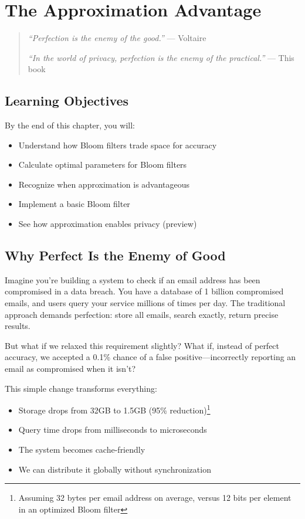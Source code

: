 \chapter{The Approximation Advantage}
\label{ch:approximation}

\begin{quote}
\emph{``Perfection is the enemy of the good.''} — Voltaire

\emph{``In the world of privacy, perfection is the enemy of the practical.''} — This book
\end{quote}

\section*{Learning Objectives}
By the end of this chapter, you will:
\begin{itemize}
\item Understand how Bloom filters trade space for accuracy
\item Calculate optimal parameters for Bloom filters
\item Recognize when approximation is advantageous
\item Implement a basic Bloom filter
\item See how approximation enables privacy (preview)
\end{itemize}

\section{Why Perfect Is the Enemy of Good}

Imagine you're building a system to check if an email address has been compromised in a data breach. You have a database of 1 billion compromised emails, and users query your service millions of times per day. The traditional approach demands perfection: store all emails, search exactly, return precise results.

But what if we relaxed this requirement slightly? What if, instead of perfect accuracy, we accepted a 0.1\% chance of a false positive—incorrectly reporting an email as compromised when it isn't?

This simple change transforms everything:
\begin{itemize}
    \item Storage drops from 32GB to 1.5GB (95\% reduction)\footnote{Assuming 32 bytes per email address on average, versus 12 bits per element in an optimized Bloom filter}
    \item Query time drops from milliseconds to microseconds
    \item The system becomes cache-friendly
    \item We can distribute it globally without synchronization
\end{itemize}

